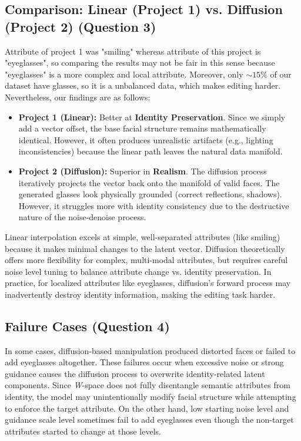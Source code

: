 \documentclass[12pt]{article}
\begin{document}
\subsection{Comparison: Linear (Project 1) vs. Diffusion (Project 2) (Question 3)}
Attribute of project 1 was "smiling" whereas attribute of this project is "eyeglasses", so comparing the results may not be fair in this sense because "eyeglasses" is a more complex and local attribute. Moreover, only $\sim15\%$ of our dataset have glasses, so it is a unbalanced data, which makes editing harder. Nevertheless, our findings are as follows:
\begin{itemize}
    \item \textbf{Project 1 (Linear):} Better at \textbf{Identity Preservation}. Since we simply add a vector offset, the base facial structure remains mathematically identical. However, it often produces unrealistic artifacts (e.g., lighting inconsistencies) because the linear path leaves the natural data manifold.
    \item \textbf{Project 2 (Diffusion):} Superior in \textbf{Realism}. The diffusion process iteratively projects the vector back onto the manifold of valid faces. The generated glasses look physically grounded (correct reflections, shadows). However, it struggles more with identity consistency due to the destructive nature of the noise-denoise process.
\end{itemize}
Linear interpolation excels at simple, well-separated attributes (like smiling) because it makes minimal changes to the latent vector. Diffusion theoretically offers more flexibility for complex, multi-modal attributes, but requires careful noise level tuning to balance attribute change vs. identity preservation. In practice, for localized attributes like eyeglasses, diffusion's forward process may inadvertently destroy identity information, making the editing task harder.





\subsection{Failure Cases (Question 4)}
In some cases, diffusion-based manipulation produced distorted faces or failed to add eyeglasses altogether. These failures occur when excessive noise or strong guidance causes the diffusion process to overwrite identity-related latent components. Since \textit{W}-space does not fully disentangle semantic attributes from identity, the model may unintentionally modify facial structure while attempting to enforce the target attribute. On the other hand, low starting noise level and guidance scale level sometimes fail to add eyeglasses even though the non-target attributes started to change at those levels.
\end{document}
